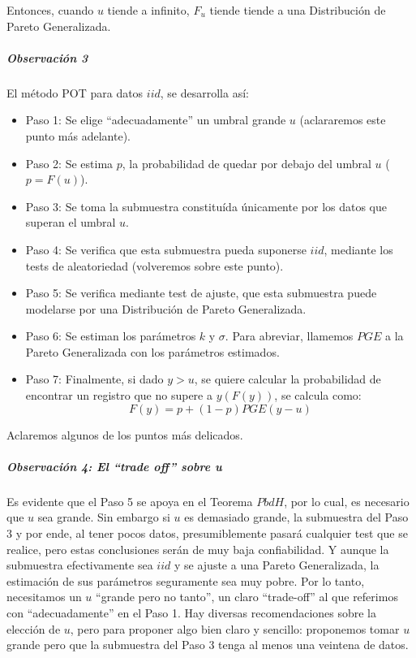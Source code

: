 \documentclass[
  12pt]{article}
\begin{document}
Entonces, cuando \(u\) tiende a infinito, \(F_u\) tiende tiende a una
Distribución de Pareto Generalizada.

\subparagraph{Observación 3}\label{observaciuxf3n-3}

El método POT para datos \(iid\), se desarrolla así:

\begin{itemize}
\item Paso 1: Se elige “adecuadamente” un umbral grande $u$ (aclararemos este punto más adelante).
\item Paso 2: Se estima $p$, la probabilidad de quedar por debajo del umbral $u$ ($p=F(u)$).
\item Paso 3: Se toma la submuestra constituída únicamente por los datos que superan el umbral $u$.
\item Paso 4: Se verifica que esta submuestra pueda suponerse $iid$, mediante los tests de aleatoriedad (volveremos sobre este punto).
\item Paso 5: Se verifica mediante test de ajuste, que esta submuestra puede modelarse por una Distribución de Pareto Generalizada.
\item Paso 6: Se estiman los parámetros $k$ y $\sigma$. Para abreviar, llamemos $PGE$ a la Pareto Generalizada con los parámetros estimados.
\item Paso 7: Finalmente, si dado $y >u$, se quiere calcular la probabilidad de encontrar un registro que no supere a $y (F(y))$, se calcula como:
\begin{equation}
F(y)=p +(1-p)PGE(y-u)
\end{equation}
\end{itemize}

Aclaremos algunos de los puntos más delicados.

\subparagraph{Observación 4: El ``trade off'' sobre
u}\label{observaciuxf3n-4-el-trade-off-sobre-u}

Es evidente que el Paso 5 se apoya en el Teorema \(PbdH\), por lo cual,
es necesario que \(u\) sea grande. Sin embargo si \(u\) es demasiado
grande, la submuestra del Paso 3 y por ende, al tener pocos datos,
presumiblemente pasará cualquier test que se realice, pero estas
conclusiones serán de muy baja confiabilidad. Y aunque la submuestra
efectivamente sea \(iid\) y se ajuste a una Pareto Generalizada, la
estimación de sus parámetros seguramente sea muy pobre. Por lo tanto,
necesitamos un \(u\) ``grande pero no tanto'', un claro ``trade-off'' al
que referimos con ``adecuadamente'' en el Paso 1. Hay diversas
recomendaciones sobre la elección de \(u\), pero para proponer algo bien
claro y sencillo: proponemos tomar \(u\) grande pero que la submuestra
del Paso 3 tenga al menos una veintena de datos.
\end{document}
